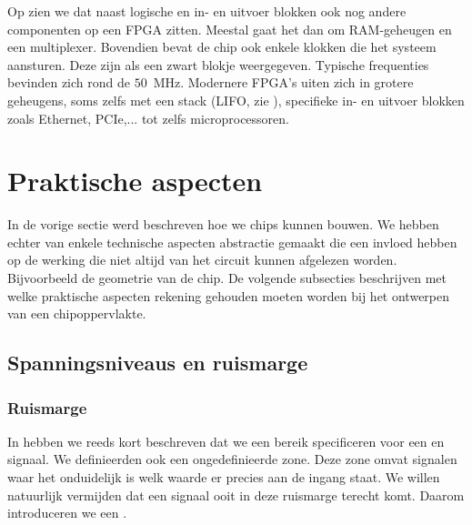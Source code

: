 Op  zien we dat naast logische en in- en uitvoer blokken ook nog andere componenten op een FPGA zitten. Meestal gaat het dan om RAM-geheugen en een multiplexer. Bovendien bevat de chip ook enkele klokken die het systeem aansturen. Deze zijn als een zwart blokje weergegeven. Typische frequenties bevinden zich rond de $50$~MHz. Modernere FPGA's uiten zich in grotere geheugens, soms zelfs met een stack (LIFO, zie ), specifieke in- en uitvoer blokken zoals Ethernet, PCIe,... tot zelfs microprocessoren.

\section{Praktische aspecten}
In de vorige sectie werd beschreven hoe we chips kunnen bouwen. We hebben echter van enkele technische aspecten abstractie gemaakt die een invloed hebben op de werking die niet altijd van het circuit kunnen afgelezen worden. Bijvoorbeeld de geometrie van de chip. De volgende subsecties beschrijven met welke praktische aspecten rekening gehouden moeten worden bij het ontwerpen van een chipoppervlakte.

\subsection{Spanningsniveaus en ruismarge}
\subsubsection{Ruismarge}
In  hebben we reeds kort beschreven dat we een bereik specificeren voor een  en  signaal.  We definieerden ook een ongedefinieerde zone. Deze zone omvat signalen waar het onduidelijk is welk waarde er precies aan de ingang staat. We willen natuurlijk vermijden dat een signaal ooit in deze ruismarge terecht komt. Daarom introduceren we een .

